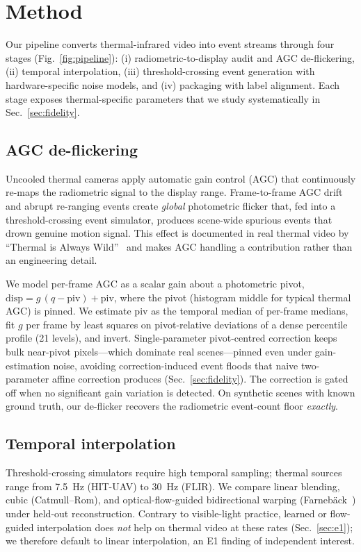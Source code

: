 \section{Method}
\label{sec:method}

Our pipeline converts thermal-infrared video into event streams through four
stages (Fig.~\ref{fig:pipeline}): (i) radiometric-to-display audit and AGC
de-flickering, (ii) temporal interpolation, (iii) threshold-crossing event
generation with hardware-specific noise models, and (iv) packaging with
label alignment. Each stage exposes thermal-specific parameters that we
study systematically in Sec.~\ref{sec:fidelity}.

\subsection{AGC de-flickering}
\label{sec:agc}
Uncooled thermal cameras apply automatic gain control (AGC) that continuously
re-maps the radiometric signal to the display range. Frame-to-frame AGC drift
and abrupt re-ranging events create \emph{global} photometric flicker that, fed
into a threshold-crossing event simulator, produces scene-wide spurious events
that drown genuine motion signal. This effect is documented in real thermal
video by ``Thermal is Always Wild''~\cite{thermalwild2026} and makes AGC
handling a contribution rather than an engineering detail.

We model per-frame AGC as a scalar gain about a photometric pivot,
$\mathrm{disp} = g\,(q - \mathrm{piv}) + \mathrm{piv}$, where the pivot
(histogram middle for typical thermal AGC) is pinned. We estimate
$\mathrm{piv}$ as the temporal median of per-frame medians, fit $g$ per frame
by least squares on pivot-relative deviations of a dense percentile profile
(21 levels), and invert. Single-parameter pivot-centred correction keeps
bulk near-pivot pixels---which dominate real scenes---pinned even under
gain-estimation noise, avoiding correction-induced event floods that naive
two-parameter affine correction produces (Sec.~\ref{sec:fidelity}). The
correction is gated off when no significant gain variation is detected. On
synthetic scenes with known ground truth, our de-flicker recovers the
radiometric event-count floor \emph{exactly}.

\subsection{Temporal interpolation}
\label{sec:interp}
Threshold-crossing simulators require high temporal sampling; thermal sources
range from \SI{7.5}{\hertz} (HIT-UAV) to \SI{30}{\hertz} (FLIR). We compare
linear blending, cubic (Catmull--Rom), and optical-flow-guided bidirectional
warping (Farneb\"ack~\cite{farneback2003}) under held-out reconstruction.
Contrary to visible-light practice, learned or flow-guided interpolation does
\emph{not} help on thermal video at these rates (Sec.~\ref{sec:e1}); we
therefore default to linear interpolation, an E1 finding of independent
interest.


